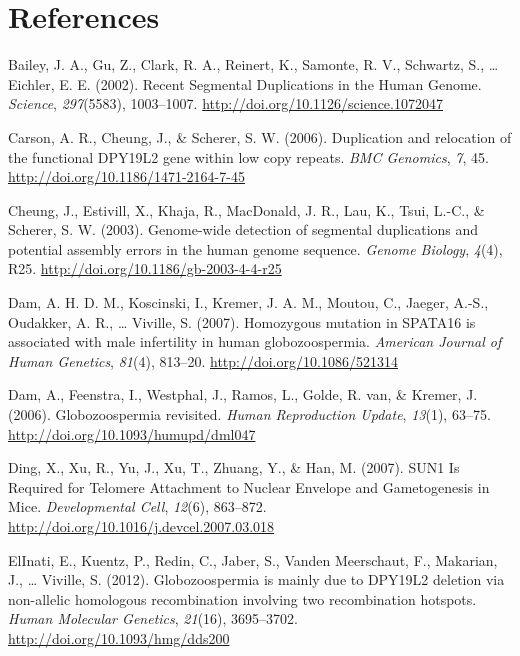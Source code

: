 \documentclass[12pt,twoside]{reedthesis}
\theoremstyle{definition}
\theoremstyle{definition}
\theoremstyle{remark}
\begin{document}
  \chapter*{References}\label{references}
  
  \hypertarget{refs}{}
  \hypertarget{ref-Bailey2002}{}
  Bailey, J. A., Gu, Z., Clark, R. A., Reinert, K., Samonte, R. V.,
  Schwartz, S., \ldots{} Eichler, E. E. (2002). Recent Segmental
  Duplications in the Human Genome. \emph{Science}, \emph{297}(5583),
  1003--1007. \url{http://doi.org/10.1126/science.1072047}
  
  \hypertarget{ref-Carson2006}{}
  Carson, A. R., Cheung, J., \& Scherer, S. W. (2006). Duplication and
  relocation of the functional DPY19L2 gene within low copy repeats.
  \emph{BMC Genomics}, \emph{7}, 45.
  \url{http://doi.org/10.1186/1471-2164-7-45}
  
  \hypertarget{ref-Cheung2003}{}
  Cheung, J., Estivill, X., Khaja, R., MacDonald, J. R., Lau, K., Tsui,
  L.-C., \& Scherer, S. W. (2003). Genome-wide detection of segmental
  duplications and potential assembly errors in the human genome sequence.
  \emph{Genome Biology}, \emph{4}(4), R25.
  \url{http://doi.org/10.1186/gb-2003-4-4-r25}
  
  \hypertarget{ref-Dam2007}{}
  Dam, A. H. D. M., Koscinski, I., Kremer, J. A. M., Moutou, C., Jaeger,
  A.-S., Oudakker, A. R., \ldots{} Viville, S. (2007). Homozygous mutation
  in SPATA16 is associated with male infertility in human globozoospermia.
  \emph{American Journal of Human Genetics}, \emph{81}(4), 813--20.
  \url{http://doi.org/10.1086/521314}
  
  \hypertarget{ref-Dam2006}{}
  Dam, A., Feenstra, I., Westphal, J., Ramos, L., Golde, R. van, \&
  Kremer, J. (2006). Globozoospermia revisited. \emph{Human Reproduction
  Update}, \emph{13}(1), 63--75.
  \url{http://doi.org/10.1093/humupd/dml047}
  
  \hypertarget{ref-Ding2007}{}
  Ding, X., Xu, R., Yu, J., Xu, T., Zhuang, Y., \& Han, M. (2007). SUN1 Is
  Required for Telomere Attachment to Nuclear Envelope and Gametogenesis
  in Mice. \emph{Developmental Cell}, \emph{12}(6), 863--872.
  \url{http://doi.org/10.1016/j.devcel.2007.03.018}
  
  \hypertarget{ref-ElInati2012}{}
  ElInati, E., Kuentz, P., Redin, C., Jaber, S., Vanden Meerschaut, F.,
  Makarian, J., \ldots{} Viville, S. (2012). Globozoospermia is mainly due
  to DPY19L2 deletion via non-allelic homologous recombination involving
  two recombination hotspots. \emph{Human Molecular Genetics},
  \emph{21}(16), 3695--3702. \url{http://doi.org/10.1093/hmg/dds200}
  
\end{document}
